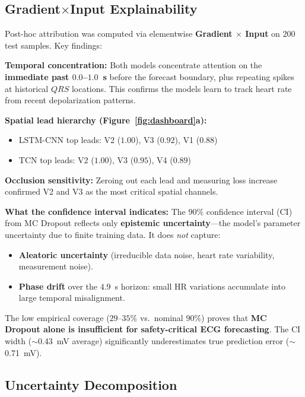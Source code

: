 \documentclass[10pt,journal,compsoc]{IEEEtran}
\begin{document}
\subsection{Gradient$\times$Input Explainability}

Post-hoc attribution was computed via elementwise \textbf{Gradient $\times$ Input} on $200$ test samples. Key findings:

\textbf{Temporal concentration:} Both models concentrate attention on the \textbf{immediate past $0.0$--$1.0$~s} before the forecast boundary, plus repeating spikes at historical $QRS$ locations. This confirms the models learn to track heart rate from recent depolarization patterns.

\textbf{Spatial lead hierarchy (Figure~\ref{fig:dashboard}a):}
\begin{itemize}
    \item LSTM-CNN top leads: V2 ($1.00$), V3 ($0.92$), V1 ($0.88$)
    \item TCN top leads: V2 ($1.00$), V3 ($0.95$), V4 ($0.89$)
\end{itemize}

\textbf{Occlusion sensitivity:} Zeroing out each lead and measuring loss increase confirmed V2 and V3 as the most critical spatial channels.

\textbf{What the confidence interval indicates:}
The $90\%$ confidence interval (CI) from MC Dropout reflects only \textbf{epistemic uncertainty}---the model's parameter uncertainty due to finite training data. It does \textit{not} capture:
\begin{itemize}
    \item \textbf{Aleatoric uncertainty} (irreducible data noise, heart rate variability, measurement noise).
    \item \textbf{Phase drift} over the $4.9$~s horizon: small HR variations accumulate into large temporal misalignment.
\end{itemize}
The low empirical coverage ($29$--$35\%$ vs.\ nominal $90\%$) proves that \textbf{MC Dropout alone is insufficient for safety-critical ECG forecasting}. The CI width ($\sim$0.43~mV average) significantly underestimates true prediction error ($\sim$0.71~mV).

\subsection{Uncertainty Decomposition}
\end{document}
